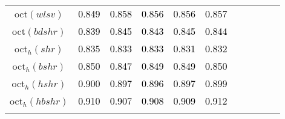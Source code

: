 \begin{tabular}[t]{c|>{}cccc>{}c|ccccc}
oct$(wlsv)$ & \textcolor{black}{0.849} & \textcolor{black}{0.858} & \textcolor{black}{0.856} & \textcolor{black}{0.856} & \textcolor{black}{0.857} &  &  &  &  & \\
oct$(bdshr)$ & \textcolor{black}{0.839} & \textcolor{black}{0.845} & \textcolor{black}{0.843} & \textcolor{black}{0.845} & \textcolor{black}{0.844} &  &  &  &  & \\
oct$_h(shr)$ & \textcolor{black}{0.835} & \textcolor{black}{0.833} & \textcolor{black}{0.833} & \textcolor{black}{0.831} & \textcolor{black}{0.832} &  &  &  &  & \\
oct$_h(bshr)$ & \textcolor{black}{0.850} & \textcolor{black}{0.847} & \textcolor{black}{0.849} & \textcolor{black}{0.849} & \textcolor{black}{0.850} &  &  &  &  & \\
oct$_h(hshr)$ & \textcolor{black}{0.900} & \textcolor{black}{0.897} & \textcolor{black}{0.896} & \textcolor{black}{0.897} & \textcolor{black}{0.899} &  &  &  &  & \\
oct$_h(hbshr)$ & \textcolor{black}{0.910} & \textcolor{black}{0.907} & \textcolor{black}{0.908} & \textcolor{black}{0.909} & \textcolor{black}{0.912} &  &  &  &  & \\
\bottomrule
{}\\
\end{tabular}
